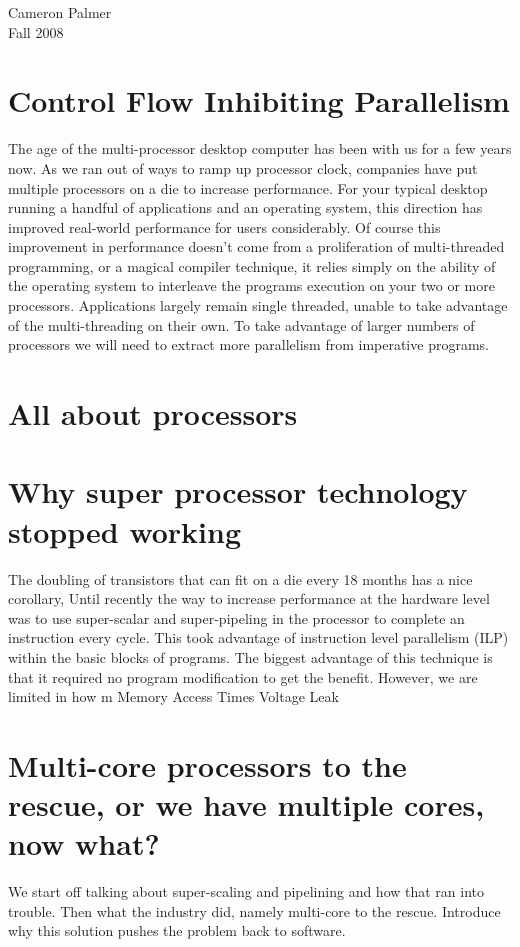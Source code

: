 \documentclass[12pt,twoside,letterpaper]{article}
\begin{document}
Cameron Palmer \\
Fall 2008

\section*{Control Flow Inhibiting Parallelism}

The age of the multi-processor desktop computer has been with us for a few years now. As we ran out of ways to ramp up processor clock, companies have put multiple processors on a die to increase performance. For your typical desktop running a handful of applications and an operating system, this direction has improved real-world performance for users considerably. Of course this improvement in performance doesn’t come from a proliferation of multi-threaded programming, or a magical compiler technique, it relies simply on the ability of the operating system to interleave the programs execution on your two or more processors. Applications largely remain single threaded, unable to take advantage of the multi-threading on their own. To take advantage of larger numbers of processors we will need to extract more parallelism from imperative programs.

\section*{All about processors}
\section*{Why super processor technology stopped working}
The doubling of transistors that can fit on a die every 18 months has a nice corollary, 
Until recently the way to increase performance at the hardware level was to use super-scalar and super-pipeling in the processor to complete an instruction every cycle. This took advantage of instruction level parallelism (ILP) within the basic blocks of programs. The biggest advantage of this technique is that it required no program modification to get the benefit. However, we are limited in how m
Memory Access Times
Voltage Leak
\section*{Multi-core processors to the rescue, or we have multiple cores, now what?}

We start off talking about super-scaling and pipelining and how that ran into trouble. Then what the industry did, namely multi-core to the rescue. Introduce why this solution pushes the problem back to software.
\end{document}
